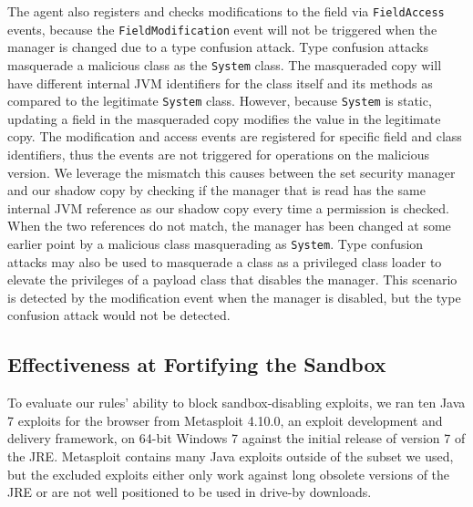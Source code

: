 \documentclass{sig-alternate}
\begin{document}
The agent also registers and checks modifications to the field via
\texttt{FieldAccess} events, 
because the \texttt{FieldModification} event will not be triggered
when the manager is changed due to a type confusion attack.  Type confusion attacks
masquerade a malicious class as the
\texttt{System} class.  The masqueraded copy will have different internal
JVM identifiers for the class itself and its methods as compared to the legitimate
\texttt{System} class. However, because \texttt{System} is static, updating a
field in the masqueraded copy modifies the value in the legitimate copy. 
The
modification and access events are registered for specific field and
class identifiers, thus the events are not triggered for operations
on the malicious version. We leverage the mismatch this causes between
the set security manager and our shadow copy by checking if
the manager that is read has the same internal
JVM reference as our shadow copy every time a permission is checked. When the two references do not match,
the manager has been changed at some earlier point by a malicious class masquerading as
\texttt{System}. Type confusion attacks may also be used to masquerade
a class as a privileged class loader to elevate the privileges of
a payload class that disables the manager. This scenario is detected
by the modification event when the manager is disabled, but the type confusion attack would not be detected.


\subsection{Effectiveness at Fortifying the Sandbox}\label{sub:Effectiveness-at-Fortifying}


To evaluate our rules' ability to 
block sandbox-disabling exploits, 
we ran ten Java 7 exploits for the browser from Metasploit 4.10.0, an exploit development and delivery framework, on 64-bit
Windows 7 against the initial release of version 7 of the JRE.
Metasploit contains many Java exploits
outside of the subset we used, but the excluded exploits either only
work against long obsolete versions of the JRE or are not well positioned
to be used in drive-by downloads. 
\end{document}
